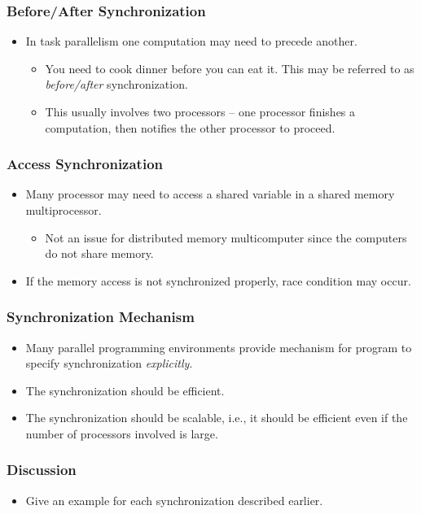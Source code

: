 \documentclass{beamer}
\begin{document}
\begin{CJK}{UTF8}{bsmi}
\begin{frame}
\frametitle{Before/After Synchronization}
\begin{itemize}
\item In task parallelism one computation may need to precede another.
\begin{itemize}
\item You need to cook dinner before you can eat it.  This may be
  referred to as {\em before/after} synchronization.
\item This usually involves two processors -- one processor finishes a
  computation, then notifies the other processor to proceed.
\end{itemize}
\end{itemize}
\end{frame}

\begin{frame}
\frametitle{Access Synchronization}
\begin{itemize}
\item Many processor may need to access a shared variable in a shared
  memory multiprocessor.
\begin{itemize}
\item Not an issue for distributed memory multicomputer since the
  computers do not share memory.
\end{itemize}
\item If the memory access is not synchronized properly, race
  condition may occur.
\end{itemize}
\end{frame}


\begin{frame}
\frametitle{Synchronization Mechanism}
\begin{itemize}
\item Many parallel programming environments provide mechanism for
  program to specify synchronization {\em explicitly}.
\item The synchronization should be efficient.
\item The synchronization should be scalable, i.e., it should be
  efficient even if the number of processors involved is large.
\end{itemize}
\end{frame}

\begin{frame}
\frametitle{Discussion}
\begin{itemize}
\item Give an example for each synchronization described earlier.
\end{itemize}
\end{frame}


\end{CJK}
\end{document}
